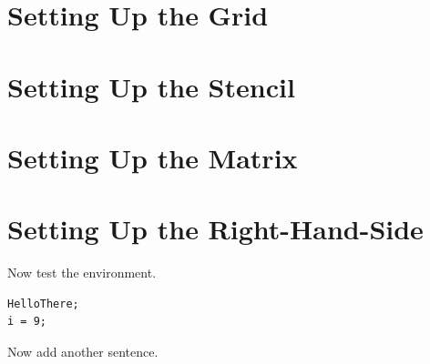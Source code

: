 
\section{Setting Up the Grid}
\label{Setting Up the Grid}


\section{Setting Up the Stencil}
\label{Setting Up the Stencil}


\section{Setting Up the Matrix}
\label{Setting Up the Matrix}


\section{Setting Up the Right-Hand-Side}
\label{Setting Up the Right-Hand-Side}





Now test the  environment.
\begin{display}
\begin{verbatim}
HelloThere;
i = 9;
\end{verbatim}
\end{display}
Now add another sentence.
